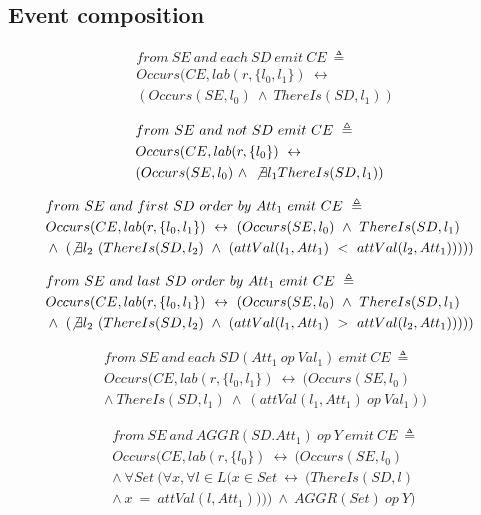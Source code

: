 \subsection{Event composition}
\begin{align*}%
&from\ SE\ and\ each\ SD\ emit\ CE\ \triangleq\\
&Occurs(CE, lab(r, \{l_0, l_1\})\ \leftrightarrow\\
&(Occurs(SE, l_0)\ \wedge\ ThereIs(SD, l_1))
\end{align*}

\begin{align*}%
&from\ SE\ and\ not\ SD\ emit\ CE\ \triangleq\\
&Occurs(CE, lab(r, \{l_0\})\ \leftrightarrow\\
&(Occurs(SE, l_0)\ \wedge\ \not \exists l_1 ThereIs(SD, l_1))
\end{align*}

\begin{align*}%
&from\ SE\ and\ first\ SD\ order\ by\ Att_1\ emit\ CE\ \triangleq\\
&Occurs(CE, lab(r, \{l_0, l_1\})\ \leftrightarrow\ (Occurs(SE, l_0)\ \wedge\ ThereIs(SD, l_1)\\
&\wedge\ (\not \exists l_2\ (ThereIs(SD, l_2)\ \wedge\ (attVal(l_1, Att_1)\ <\ attVal(l_2, Att_1)))))
\end{align*}

\begin{align*}%
&from\ SE\ and\ last\ SD\ order\ by\ Att_1\ emit\ CE\ \triangleq\\
&Occurs(CE, lab(r, \{l_0, l_1\})\ \leftrightarrow\ (Occurs(SE, l_0)\ \wedge\ ThereIs(SD, l_1)\\
&\wedge\ (\not \exists l_2\ (ThereIs(SD, l_2)\ \wedge\ (attVal(l_1, Att_1)\ >\ attVal(l_2, Att_1)))))
\end{align*}

\begin{align*}%
&from\ SE\ and\ each\ SD(Att_1\ op \ Val_1)\ emit\ CE\ \triangleq\\
&Occurs(CE, lab(r, \{l_0, l_1\})\ \leftrightarrow\ (Occurs(SE, l_0)\\
&\wedge\ ThereIs(SD, l_1)\ \wedge\ (attVal(l_1, Att_1)\ op\ Val_1))
\end{align*}

\begin{align*}%
&from\ SE\ and\ AGGR(SD.Att_1)\ op\ Y\ emit\ CE\ \triangleq\\
&Occurs(CE, lab(r, \{l_0\})\ \leftrightarrow\ (Occurs(SE, l_0)\\
&\wedge\ \forall Set\ (\forall x, \forall l \in L
(x \in Set\ \leftrightarrow\ (ThereIs(SD, l)\\
&\wedge\ x\ =\ attVal(l, Att_1))))\ \wedge\ AGGR(Set)\ op\ Y)
\end{align*}

